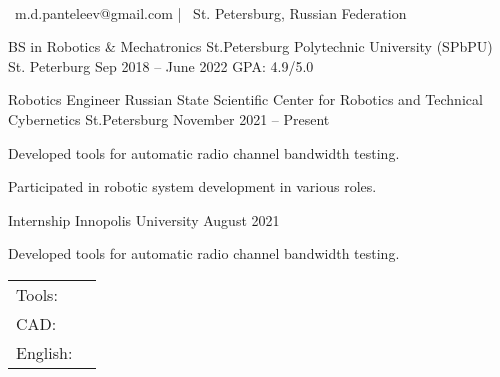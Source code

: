 \documentclass[]{awesome-cv}
\begin{document}
    
\begin{center}
	  \\
	\vspace{2mm}
	{\faEnvelope\ m.d.panteleev@gmail.com} | {\faMapMarker\ St. Petersburg, Russian Federation}
\end{center}
\begin{cventries}
	\cventry
	{BS in Robotics \& Mechatronics}
	{St.Petersburg Polytechnic University (SPbPU)}
	{St. Peterburg}
	{Sep 2018 – June 2022}
	{GPA: 4.9/5.0}
\end{cventries}

\vspace{-2mm}
\begin{cventries}
	\cventry
	{Robotics Engineer}
	{Russian State Scientific Center for Robotics and Technical Cybernetics}
	{St.Petersburg}
	{November 2021 – Present}
	{\begin{cvitems}
		\item {Developed tools for automatic radio channel bandwidth testing.}
		\item {Participated in robotic system development in various roles.}
		\end{cvitems}}
	\cventry
	{Internship}
	{Innopolis University}
	{}
	{August 2021}
	{\begin{cvitems}
		\item {Developed tools for automatic radio channel bandwidth testing.}
		\end{cvitems}}
\end{cventries}
\begin{cventries}
	\cventry
	{}
	{\def\arraystretch{1.15}{\begin{tabular}{ l l }
		Tools:  & {\skill{ C/C++, Python, ROS, OpenCV, Matlab, Embedded Development}} \\
		CAD:  & {\skill{ Fusion 360, Altium Designer, Solidworks, Visual Components}} \\
		English:  & {\skill{ C1 (IELTS 8.0)}} \\
		\end{tabular}}}
	{}
	{}
	{}
\end{cventries}
\end{document}
